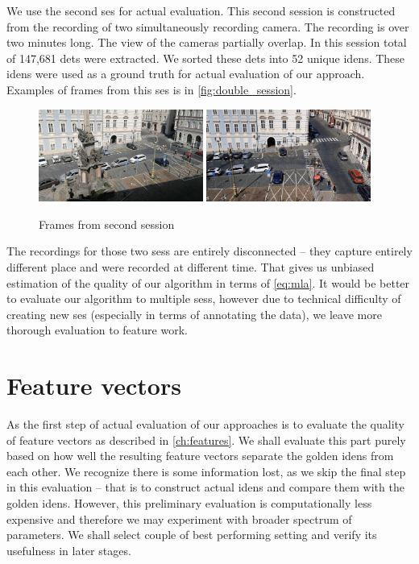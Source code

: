We use the second \gls{ses} for actual evaluation. This second session is
constructed from the recording of two simultaneously recording camera. The
recording is over two minutes long. The view of the cameras partially overlap.
In this session total of 147,681 \glspl{det} were extracted. We sorted these
\glspl{det} into 52 unique \glspl{iden}. These \glspl{iden} were used as a
ground truth for actual evaluation of our approach. Examples of frames from
this \gls{ses} is in \autoref{fig:double_session}.

\begin{figure}
    \centering
    \includegraphics[width=0.48\textwidth]{img/frame_double_session_1_smaller.png}
    \includegraphics[width=0.48\textwidth]{img/frame_double_session_2_smaller.png}
    \caption{Frames from second session}
    \label{fig:double_session}
\end{figure}

The recordings for those two \glspl{ses} are entirely disconnected -- they
capture entirely different place and were recorded at different time. That gives
us unbiased estimation of the quality of our algorithm in terms of
\autoref{eq:mla}. It would be better to evaluate our algorithm to multiple
\glspl{ses}, however due to technical difficulty of creating new \gls{ses}
(especially in terms of annotating the data), we leave more thorough evaluation
to feature work.

\section{Feature vectors}

As the first step of actual evaluation of our approaches is to evaluate the
quality of feature vectors as described in \autoref{ch:features}. We shall
evaluate this part purely based on how well the resulting feature vectors
separate the golden \glspl{iden} from each other. We recognize there is some
information lost, as we skip the final step in this evaluation -- that is to
construct actual \glspl{iden} and compare them with the golden \glspl{iden}.
However, this preliminary evaluation is computationally less expensive and
therefore we may experiment with broader spectrum of parameters. We shall
select couple of best performing setting and verify its usefulness in later
stages.

